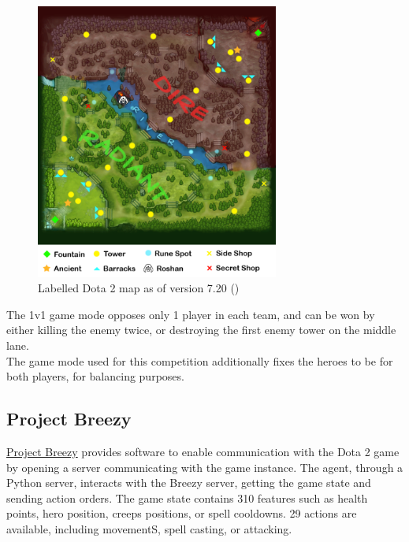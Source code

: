 \begin{figure}[H]
 \centering
 \captionsetup{justification=centering, margin=0.5cm}
 \includegraphics[width=8cm]{images/dota-map.png}
\caption{Labelled Dota 2 map as of version 7.20 (\href{https://dota2.gamepedia.com/Map}{\color{blue}{Source}})}
 \label{fig:dota-2-map}
\end{figure}

The 1v1 game mode opposes only 1 player in each team, and can be won by either killing the enemy twice, or destroying the first enemy tower on the middle lane. \\
The game mode used for this competition additionally fixes the heroes to be \href{https://dota2.gamepedia.com/Shadow_Fiend}{\color{blue}{Shadow Fiend}} for both players, for balancing purposes.

\subsection{Project Breezy}
\href{https://web.cs.dal.ca/~dota2/?page_id=353}{\color{blue} {Project Breezy}} provides software to enable communication with the Dota 2 game by opening a server communicating with the game instance. The agent, through a Python server, interacts with the Breezy server, getting the game state and sending action orders. The game state contains 310 features such as health points, hero position, creeps positions, or spell cooldowns. 29 actions are available, including movementS, spell casting, or attacking.

